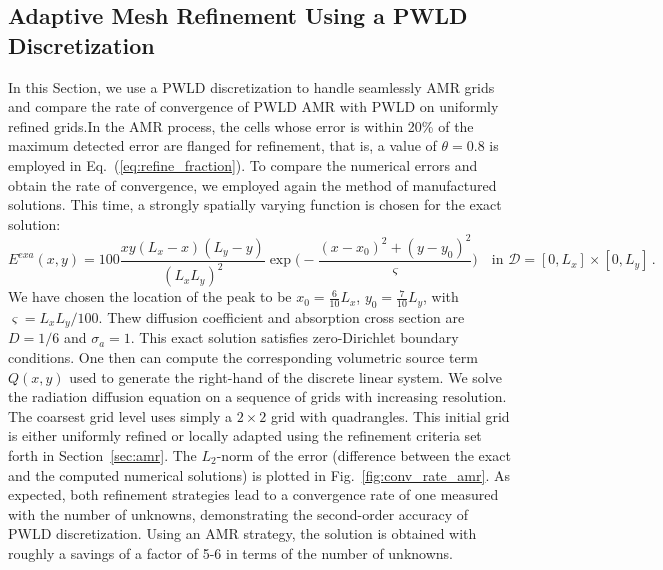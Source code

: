 \documentclass[preprint,10pt]{elsarticle}
\newcommand{\D}{\mathcal{D}}
\newcommand{\eqt}[1]{Eq.~(\ref{#1})}                     %
\newcommand{\fig}[1]{Fig.~\ref{#1}}                      %
\newcommand{\sct}[1]{Section~\ref{#1}}                   %
\begin{document}
\subsection{Adaptive Mesh Refinement Using a PWLD Discretization}

In this Section, we use a PWLD discretization to handle seamlessly AMR grids and compare the rate
of convergence of PWLD AMR with PWLD on uniformly refined grids.In the AMR process, the cells whose
error is within 20\% of the maximum detected error are flanged for refinement, that is, a value of 
$\theta=0.8$ is employed in \eqt{eq:refine_fraction}.
To compare the numerical errors and obtain the rate of convergence, we employed again the method of 
manufactured solutions. This time, a strongly spatially varying function is chosen
for the exact solution:
\begin{equation}
	E^{\textit{exa}}(x,y) = 100 \frac{xy(L_x-x)(L_y-y)}{(L_x L_y)^2}\exp\Big(-\frac{(x-x_0)^2+(y-y_0)^2}{\varsigma}\Big)
	 \quad \text{in } \D=[0,L_x]\times [0,L_y] \,.
\end{equation}
We have chosen the location of the peak to be $x_0=\tfrac{6}{10}L_x$, $y_0=\tfrac{7}{10}L_y$, with $\varsigma=L_xL_y/100$. 
Thew diffusion coefficient and absorption cross section are  $D=1/6$ and $\sigma_a=1$. 
This exact solution satisfies zero-Dirichlet boundary conditions. One then can compute 
the corresponding volumetric source term $Q(x,y)$ used to generate the right-hand of the discrete linear system. 
We solve the radiation diffusion equation on a sequence of grids with increasing resolution. The coarsest grid level
uses simply a $2\times 2$ grid with quadrangles. This initial grid is either uniformly refined or locally adapted 
using the refinement criteria set forth in \sct{sec:amr}. The $L_2$-norm of the error (difference
between the exact and the computed numerical solutions) is plotted in \fig{fig:conv_rate_amr}. As expected, both refinement
strategies lead to a convergence rate of one measured with the number of unknowns, demonstrating the 
second-order accuracy of PWLD discretization. Using an AMR strategy, the solution is obtained with roughly a savings of
a factor of 5-6 in terms of the number of unknowns. 
\end{document}
